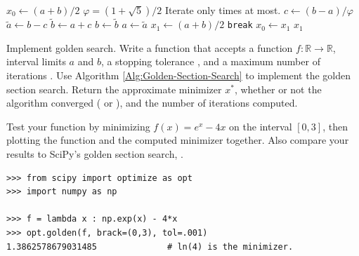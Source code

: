 \begin{algorithm}[H]
\begin{algorithmic}[1]
   \State $x_0 \gets (a + b)/2$
   \State $\varphi = (1+\sqrt{5})/2$
        \Comment Iterate only  times at most.
        \State $c \gets (b - a)/\varphi$
        \State $\tilde{a} \gets b - c$
        \State $\tilde{b} \gets a + c$
            \State $b \gets \tilde{b}$
         \Else{}
            \State $a \gets \tilde{a}$
                \EndIf
        \State $x_1 \gets (a + b)/2$
              \State \texttt{break}
       \EndIf
        \State $x_0 \gets x_1$
   \EndFor
   \State {} $x_1$
\EndProcedure
\end{algorithmic}
\caption{The Golden Section Search}
\label{Alg:Golden-Section-Search}
\end{algorithm}

\begin{problem}{Implement golden search.}
Write a function that accepts a function $f:\mathbb{R}\rightarrow\mathbb{R}$, interval limits $a$ and $b$, a stopping tolerance , and a maximum number of iterations .
Use Algorithm \ref{Alg:Golden-Section-Search} to implement the golden section search.
Return the approximate minimizer $x^*$, whether or not the algorithm converged ( or ), and the number of iterations computed.

Test your function by minimizing $f(x) = e^x - 4x$ on the interval $[0, 3]$, then plotting the function and the computed minimizer together.
Also compare your results to SciPy's golden section search, .

\begin{lstlisting}
>>> from scipy import optimize as opt
>>> import numpy as np

>>> f = lambda x : np.exp(x) - 4*x
>>> opt.golden(f, brack=(0,3), tol=.001)
1.3862578679031485              # ln(4) is the minimizer.
\end{lstlisting}
\label{prob:golden-section-search}
\end{problem}




